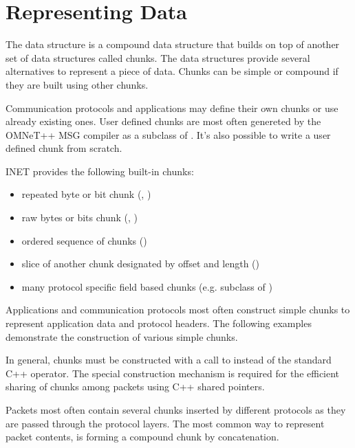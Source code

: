 \section{Representing Data}

The  data structure is a compound data structure that builds on
top of another set of data structures called chunks. The  data
structures provide several alternatives to represent a piece of data. Chunks can
be simple or compound if they are built using other chunks.

Communication protocols and applications may define their own chunks or use
already existing ones. User defined chunks are most often genereted by the
OMNeT++ MSG compiler as a subclass of . It's also
possible to write a user defined chunk from scratch.

INET provides the following built-in chunks:

\begin{itemize}
    \item repeated byte or bit chunk (, )
    \item raw bytes or bits chunk (, )
    \item ordered sequence of chunks ()
    \item slice of another chunk designated by offset and length ()
    \item many protocol specific field based chunks (e.g.  subclass of )
\end{itemize}

Applications and communication protocols most often construct simple chunks to
represent application data and protocol headers. The following examples
demonstrate the construction of various simple chunks.


In general, chunks must be constructed with a call to 
instead of the standard C++  operator. The special construction
mechanism is required for the efficient sharing of chunks among packets using
C++ shared pointers.

Packets most often contain several chunks inserted by different protocols as
they are passed through the protocol layers. The most common way to represent
packet contents, is forming a compound chunk by concatenation.

